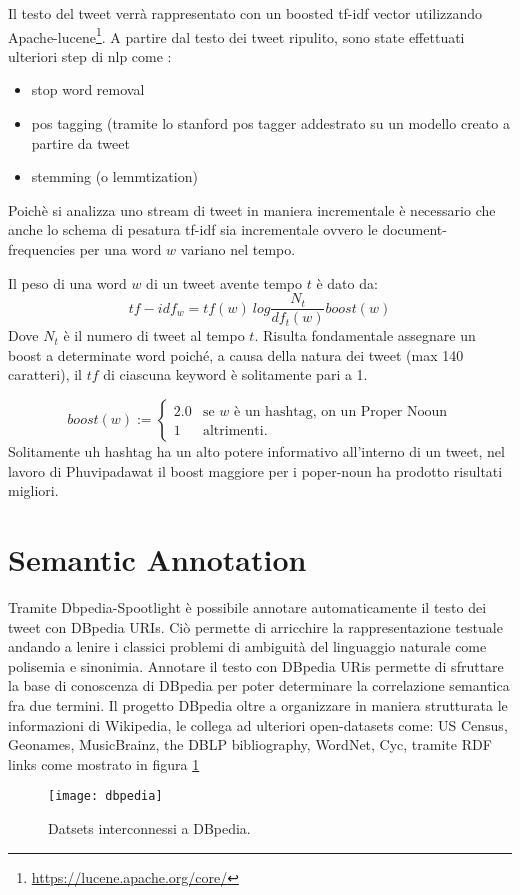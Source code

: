 Il testo del tweet verrà rappresentato con un boosted tf-idf vector utilizzando Apache-lucene\footnote{\href{https://lucene.apache.org/core/}{https://lucene.apache.org/core/}}. 
A partire dal testo dei tweet ripulito, sono state effettuati ulteriori step di nlp come :
\begin{itemize}
\item stop word removal
\item pos tagging (tramite lo stanford pos tagger addestrato su un modello  creato a partire da tweet
\item stemming (o lemmtization)
\end{itemize}
Poich\`e si analizza uno stream di tweet in maniera incrementale è necessario che anche lo schema di pesatura tf-idf sia incrementale ovvero le document-frequencies per una word $w$ variano nel tempo. 

Il peso di una word $w$ di un tweet avente tempo $t$ è dato da:
\begin{equation}
tf-idf_w=tf(w)\ log\frac{N_t}{df_t(w)}boost(w)
\end{equation}
Dove $N_t$ è il numero di tweet al tempo $t$.
Risulta fondamentale assegnare un boost a determinate word poiché, a causa della natura dei tweet (max 140 caratteri), il $tf$ di ciascuna keyword è solitamente pari a 1.  


\begin{equation*}
boost(w):=\begin{cases}
2.0 & \text{se $w$ è un hashtag, on un Proper Nooun}\\
1& \text{altrimenti.}
\end{cases}
\end{equation*}
Solitamente uh hashtag ha un alto potere informativo all’interno di un tweet, nel lavoro di  Phuvipadawat \cite{Phuvipadawat:2010:BND:1913791.1913911}  il boost maggiore per i poper-noun ha prodotto risultati migliori.

\newpage
\section{Semantic Annotation}
Tramite Dbpedia-Spootlight \cite{isem2013daiber} è possibile annotare automaticamente il testo dei tweet con DBpedia URIs.  Ciò permette di arricchire la rappresentazione testuale andando a lenire i classici problemi di ambiguità del linguaggio naturale come polisemia e sinonimia.  
Annotare il testo con DBpedia URis permette di sfruttare la base di conoscenza di DBpedia per poter determinare la correlazione semantica fra due termini. 
Il progetto DBpedia \cite{DBLP:conf/semweb/AuerBKLCI07} oltre a organizzare in maniera strutturata le informazioni di Wikipedia, le collega ad ulteriori open-datasets come: US Census, Geonames, MusicBrainz, the DBLP bibliography, WordNet, Cyc, tramite RDF links come mostrato in figura \ref{fig:dbpedia}  
\begin{figure}[h]
    \centering
    \texttt{[image: dbpedia]}
    \caption{Datsets interconnessi a DBpedia.}
    \label{fig:dbpedia}
\end{figure}  


